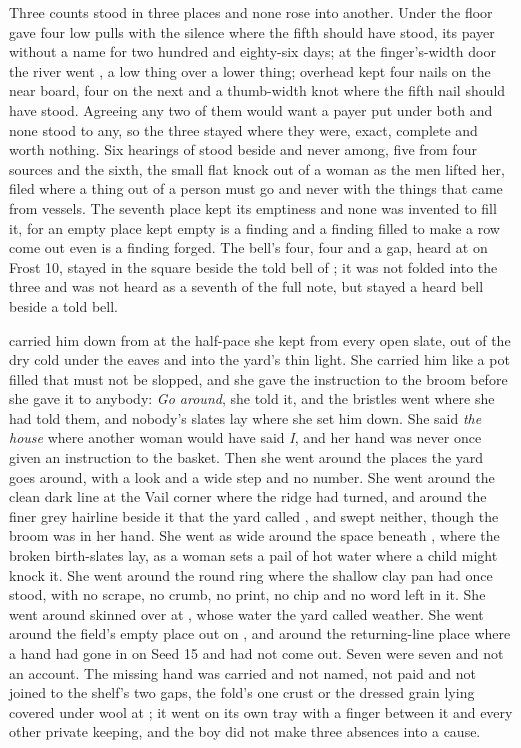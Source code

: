 Three counts stood in three places and none rose into another. Under the floor  gave four low pulls with the silence where the fifth should have stood, its payer without a name for two hundred and eighty-six days; at the finger's-width door the river went , a low thing over a lower thing; overhead  kept four nails on the near board, four on the next and a thumb-width knot where the fifth nail should have stood. Agreeing any two of them would want a payer put under both and none stood to any, so the three stayed where they were, exact, complete and worth nothing. Six hearings of  stood beside and never among, five from four sources and the sixth, the small flat knock out of a woman as the men lifted her, filed where a thing out of a person must go and never with the things that came from vessels. The seventh place kept its emptiness and none was invented to fill it, for an empty place kept empty is a finding and a finding filled to make a row come out even is a finding forged. The bell's four, four and a gap, heard at  on Frost 10, stayed in the square beside the told bell of ; it was not folded into the three and was not heard as a seventh of the full note, but stayed a heard bell beside a told bell.

 carried him down from  at the half-pace she kept from every open slate, out of the dry cold under the eaves and into the yard's thin light. She carried him like a pot filled that must not be slopped, and she gave the instruction to the broom before she gave it to anybody: \emph{Go around}, she told it, and the bristles went where she had told them, and nobody's slates lay where she set him down. She said \emph{the house} where another woman would have said \emph{I}, and her hand was never once given an instruction to the basket. Then she went around the places the yard goes around, with a look and a wide step and no number. She went around the clean dark line at the Vail corner where the  ridge had turned, and around the finer grey hairline beside it that the yard called , and swept neither, though the broom was in her hand. She went as wide around the space beneath , where the broken birth-slates lay, as a woman sets a pail of hot water where a child might knock it. She went around the round ring where the shallow clay pan had once stood, with no scrape, no crumb, no print, no chip and no word left in it. She went around  skinned over at , whose water the yard called weather. She went around the field's empty place out on , and around the returning-line place where a hand had gone in on Seed 15 and had not come out. Seven were seven and not an account. The missing hand was carried and not named, not paid and not joined to the shelf's two gaps, the fold's one crust or the dressed grain lying covered under wool at ; it went on its own tray with a finger between it and every other private keeping, and the boy did not make three absences into a cause.

